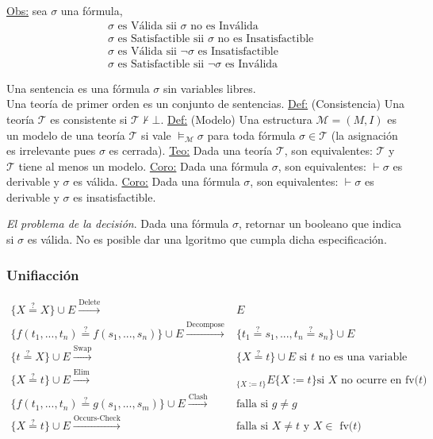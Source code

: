 \documentclass[12pt]{extarticle}
\def\definicion{\newline\underline{Def:} }
\def\teorema{\underline{Teo:} }
\def\corolario{\underline{Coro:} }
\def\observacion{\underline{Obs:} }
\def\equ{\overset{?}{=}}
\def\modelsM{\models_\mathcal{M}}
\begin{document}
\observacion sea $\sigma$ una fórmula,
\begin{align*}
  &\sigma \text{ es Válida sii } \sigma \text{ no es Inválida} \\
  &\sigma \text{ es Satisfactible sii } \sigma \text{ no es Insatisfactible} \\
  &\sigma \text{ es Válida sii } \neg\sigma \text{ es Insatisfactible} \\
  &\sigma \text{ es Satisfactible sii } \neg\sigma \text{ es Inválida}
\end{align*}

Una sentencia es una fórmula $\sigma$ sin variables libres. \\
Una teoría de primer orden es un conjunto de sentencias.
\definicion (Consistencia) Una teoría $\mathcal{T}$ es consistente si $\mathcal{T} \not\vdash \bot$.
\definicion (Modelo) Una estructura $\mathcal{M} = (M,I)$ es un modelo de una teoría $\mathcal{T}$ si vale $\modelsM \sigma$ para toda fórmula $\sigma \in \mathcal{T}$ (la asignación es irrelevante pues $\sigma$ es cerrada).
\teorema Dada una teoría $\mathcal{T}$, son equivalentes: $\mathcal{T}$ y $\mathcal{T}$ tiene al menos un modelo.
\corolario Dada una fórmula $\sigma$, son equivalentes: $\vdash \sigma$ es derivable y $\sigma$ es válida.
\corolario Dada una fórmula $\sigma$, son equivalentes: $\vdash \sigma$ es derivable y $\sigma$ es insatisfactible.

\textit{El problema de la decisión}. Dada una fórmula $\sigma$, retornar un booleano que indica si $\sigma$ es válida. No es posible dar una lgoritmo que cumpla dicha especificación.

\subsubsection{Unifiacción}
\begin{align*}
  \{X \equ X\} \cup E \overset{\text{Delete}}{\longrightarrow}& E \\
  \{f(t_1,...,t_n) \equ f(s_1,...,s_n)\} \cup E \overset{\text{Decompose}}{\longrightarrow}& \{t_1 \equ s_1, ..., t_n \equ s_n\} \cup E \\
  \{t \equ X\} \cup E \overset{\text{Swap}}{\longrightarrow}& \{X \equ t\} \cup E \text{ si } t \text{ no es una variable} \\
  \{X \equ t\} \cup E \overset{\text{Elim}}{\longrightarrow}&_{\{X := t\}} E\{X := t\} \text{si $X$ no ocurre en fv($t$)}\\
  \{f(t_1,...,t_n) \equ g(s_1,...,s_m)\} \cup E \overset{\text{Clash}}{\longrightarrow}& \text{falla si $g \neq g$} \\
  \{X \equ t\} \cup E \overset{\text{Occurs-Check}}{\longrightarrow}& \text{falla si $X \neq t$ y $X \in $ fv($t$)}
\end{align*}
\end{document}
